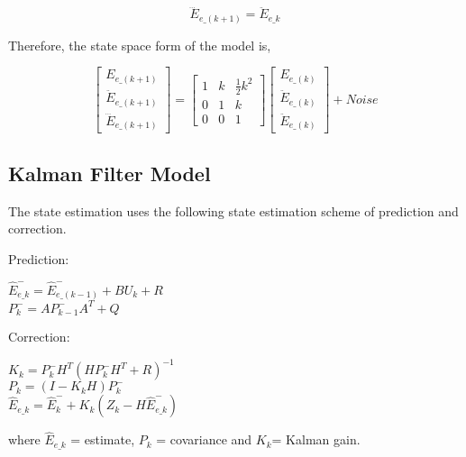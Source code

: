 \documentclass[transmag]{IEEEtran}
\begin{document}
\begin{equation}
\dddot{E}_{e\_(k+1)} = \ddot{E}_{e\_k} 
\end{equation}

Therefore, the state space form of the model is, 

\begin{equation}
\begin{bmatrix} E_{e\_(k+1)} \\ \ddot{E}_{e\_(k+1)} \\ \dddot{E}_{e\_(k+1)} \end{bmatrix}  =  \begin{bmatrix} 1  & k  & \frac{1}{2}k^2 \\ 0 & 1 & k \\ 0 & 0 & 1\end{bmatrix} \begin{bmatrix} E_{e\_(k)} \\ \ddot{E}_{e\_(k)} \\ \ddot{E}_{e\_(k)} \end{bmatrix} + Noise
\end{equation}




\subsection{Kalman Filter Model}
The state estimation uses the following state estimation scheme of prediction and correction. 

Prediction: 

\begin{center}
	$\hat{E}^{-}_{e\_k} = \hat{E}^{-}_{e\_(k-1)}+ BU_k+R$\\
	$P^{-}_k = A P^{-}_{k-1}A^T+Q$
	
\end{center}


Correction: 

\begin{center}
	$K_k = P^{-}_kH^T(HP^{-}_kH^T+R)^{-1}$\\
	$P_k = (I-K_kH)P^{-}_k$ \\
	$\hat{E}_{e\_k} = \hat{E}^{-}_k + K_k(Z_k-H\hat{E}^{-}_{e\_k})$ \\
	
\end{center}

\begin{flushleft}
	
	where $\hat{E}_{e\_k}$ = estimate,  $P_k$ = covariance and $ K_k$= Kalman gain.
\end{flushleft}
\end{document}
